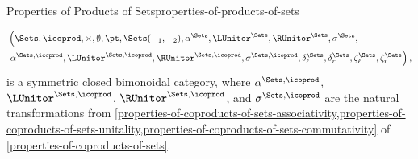 \begin{proposition}{Properties of Products of Sets}{properties-of-products-of-sets}
\begin{enumerate}
            \[
                \begin{aligned}
                    &\left(\Sets,\icoprod,\times,\emptyset,\pt,\Sets(-_{1},-_{2}),\alpha^{\Sets},\LUnitor^{\Sets},\RUnitor^{\Sets},\sigma^{\Sets},\right.\\%
                    &\left.\alpha^{\Sets,\icoprod},\LUnitor^{\Sets,\icoprod},\RUnitor^{\Sets,\icoprod},\sigma^{\Sets,\icoprod},\delta^{\Sets}_{\ell},\delta^{\Sets}_{r},\zeta^{\Sets}_{\ell},\zeta^{\Sets}_{r}\right),%
                \end{aligned}
            \]%
            is a symmetric closed bimonoidal category, where $\alpha^{\Sets,\icoprod}$, $\LUnitor^{\Sets,\icoprod}$, $\RUnitor^{\Sets,\icoprod}$, and $\sigma^{\Sets,\icoprod}$ are the natural transformations from \cref{properties-of-coproducts-of-sets-associativity,properties-of-coproducts-of-sets-unitality,properties-of-coproducts-of-sets-commutativity} of \cref{properties-of-coproducts-of-sets}.
    \end{enumerate}
\end{proposition}
